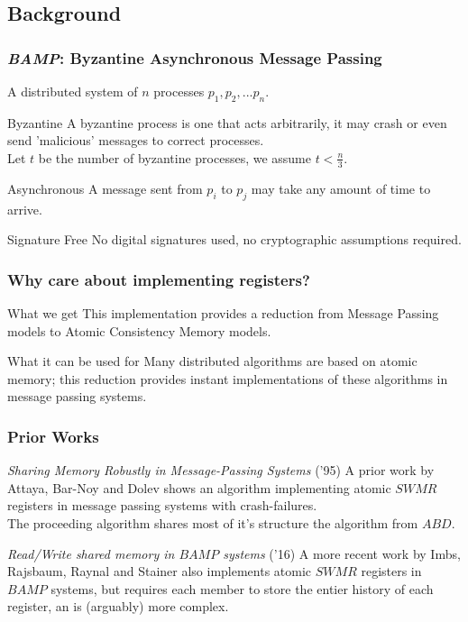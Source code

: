 \subsection{Background}
\begin{frame}
    \frametitle{\emph{BAMP}: Byzantine Asynchronous Message Passing}
    A distributed system of $n$ processes $p_1, p_2, ... p_n$.
    \begin{block}{Byzantine}
        A byzantine process is one that acts arbitrarily, it may crash or even
        send 'malicious' messages to correct processes.\\
        Let $t$ be the number of byzantine processes, we assume $t<\frac{n}{3}$.
    \end{block}
    \pause
    \begin{block}{Asynchronous}
        A message sent from $p_i$ to $p_j$ may take any amount of time to arrive.
    \end{block}
    \pause
    \begin{block}{Signature Free}
        No digital signatures used, no cryptographic assumptions required.
    \end{block}
\end{frame}
\begin{frame}
    \frametitle{Why care about implementing registers?}
    \begin{block}{What we get}
        This implementation provides a reduction from Message Passing models to Atomic Consistency Memory models.
    \end{block}
    \begin{block}{What it can be used for}
        Many distributed algorithms are based on atomic memory; this reduction provides instant implementations
        of these algorithms in message passing systems.
    \end{block}
\end{frame}

\begin{frame}
    \frametitle{Prior Works}
    \begin{alertblock}{\emph{Sharing Memory Robustly in Message-Passing Systems} ('95)}
        A prior work by \alert{Attaya}, Bar-Noy and Dolev shows
        an algorithm implementing atomic $SWMR$ registers in
        message passing \alert{systems with crash-failures}.\\
        The proceeding algorithm shares most of
        it's structure the algorithm from $ABD$. 
    \end{alertblock}
    \pause
    \begin{block}{
        \emph{Read/Write shared memory in $BAMP$ systems} ('16)}
        A more recent work by Imbs, Rajsbaum, Raynal and Stainer
        also implements atomic $SWMR$ registers in $BAMP$ systems, 
        \alert{but requires each member to store the entier history of
        each register}, an is (arguably) more complex.
    \end{block}
\end{frame}

